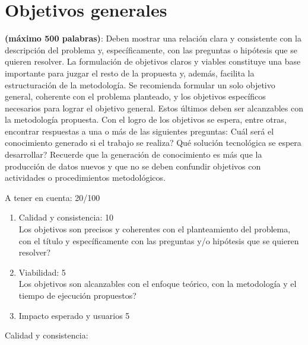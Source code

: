 \section{Objetivos generales}
\begin{instrucciones}


  \textbf{(máximo 500 palabras)}: Deben mostrar una relación clara y
  consistente con la descripción del problema y, específicamente, con
  las preguntas o hipótesis que se quieren resolver. La formulación de
  objetivos claros y viables constituye una base importante para
  juzgar el resto de la propuesta y, además, facilita la
  estructuración de la metodología. Se recomienda formular un solo
  objetivo general, coherente con el problema planteado, y los
  objetivos específicos necesarios para lograr el objetivo general.
  Estos últimos deben ser alcanzables con la metodología propuesta.
  Con el logro de los objetivos se espera, entre otras, encontrar
  respuestas a una o más de las siguientes preguntas: \textquestiondown Cuál será el
  conocimiento generado si el trabajo se realiza? \textquestiondown Qué solución
  tecnológica se espera desarrollar? Recuerde que la generación de
  conocimiento es más que la producción de datos nuevos y que no se
  deben confundir objetivos con actividades o procedimientos
  metodológicos.
\end{instrucciones}
\begin{evaluacion}
  A tener en cuenta: 20/100
  \begin{enumerate}
  \item Calidad y consistencia: 10\\
    Los objetivos son precisos y coherentes con el planteamiento del
    problema, con el título y específicamente con las preguntas y/o
    hipótesis que se quieren resolver?
  \item Viabilidad: 5\\
    Los objetivos son alcanzables con el enfoque teórico, con la
    metodología y el tiempo de ejecución propuestos?
  \item Impacto esperado y usuarios 5
  \end{enumerate}
\end{evaluacion}

\begin{evaluacion}
  Calidad y consistencia:
\end{evaluacion}

